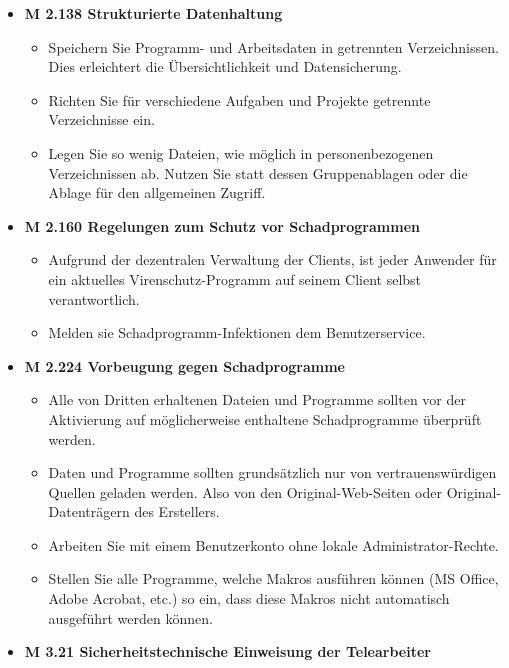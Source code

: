 \documentclass[]{article}
\begin{document}
\begin{itemize}
\item
  \textbf{M 2.138 Strukturierte Datenhaltung}

  \begin{itemize}
  \item
    Speichern Sie Programm- und Arbeitsdaten in getrennten
    Verzeichnissen. Dies erleichtert die Übersichtlichkeit und
    Datensicherung.
  \item
    Richten Sie für verschiedene Aufgaben und Projekte getrennte
    Verzeichnisse ein.
  \item
    Legen Sie so wenig Dateien, wie möglich in personenbezogenen
    Verzeichnissen ab. Nutzen Sie statt dessen Gruppenablagen oder die
    Ablage für den allgemeinen Zugriff.
  \end{itemize}
\item
  \textbf{M 2.160 Regelungen zum Schutz vor Schadprogrammen}

  \begin{itemize}
  \item
    Aufgrund der dezentralen Verwaltung der Clients, ist jeder Anwender
    für ein aktuelles Virenschutz-Programm auf seinem Client selbst
    verantwortlich.
  \item
    Melden sie Schadprogramm-Infektionen dem Benutzerservice.
  \end{itemize}
\item
  \textbf{M 2.224 Vorbeugung gegen Schadprogramme}

  \begin{itemize}
  \item
    Alle von Dritten erhaltenen Dateien und Programme sollten vor der
    Aktivierung auf möglicherweise enthaltene Schadprogramme überprüft
    werden.
  \item
    Daten und Programme sollten grundsätzlich nur von vertrauenswürdigen
    Quellen geladen werden. Also von den
    Original-Web-Seiten oder Original-Datenträgern des Erstellers.
  \item
    Arbeiten Sie mit einem Benutzerkonto ohne lokale
    Administrator-Rechte.
  \item
    Stellen Sie alle Programme, welche Makros ausführen können (MS
    Office, Adobe Acrobat, etc.) so ein, dass diese Makros nicht
    automatisch ausgeführt werden können.
  \end{itemize}
\item
  \textbf{M 3.21 Sicherheitstechnische Einweisung der Telearbeiter}


\end{itemize}
\end{document}
